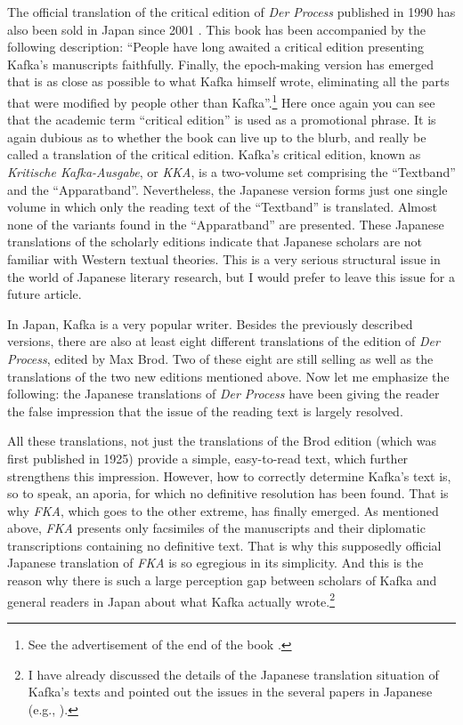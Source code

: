 \begin{paper}
The official translation of the critical edition of \emph{Der Process}
published in 1990 \citep{kafka_proces_1990-1,kafka_proces_1990} has also been sold in Japan
since 2001 \citep{kafka_shinpan_2001}. This book has been accompanied by the following
description: ``People have long awaited a critical edition presenting Kafka's
manuscripts faithfully. Finally, the epoch-making version has emerged
that is as close as possible to what Kafka himself wrote, eliminating
all the parts that were modified by people other than
Kafka''.\footnote{See the advertisement of the end of the book \citep{kafka_shinpan_2001}.} Here once again you can see that the academic term ``critical
edition'' is used as a promotional phrase. It is again dubious as to
whether the book can live up to the blurb, and really be called a
translation of the critical edition. Kafka's critical edition, known as
\emph{Kritische Kafka-Ausgabe}, or \emph{KKA}, is a two-volume set
comprising the ``Textband'' and the ``Apparatband''. Nevertheless, the
Japanese version forms just one single volume in which only the reading
text of the ``Textband'' is translated. Almost none of the variants
found in the ``Apparatband'' are presented. These Japanese translations
of the scholarly editions indicate that Japanese scholars are not
familiar with Western textual theories. This is a very serious
structural issue in the world of Japanese literary research, but I would
prefer to leave this issue for a future article.

In Japan, Kafka is a very popular writer. Besides the previously
described versions, there are also at least eight different translations
of the edition of \emph{Der Process}, edited by Max Brod. Two of these
eight \citep{kafka_shinpan_1953,kafka_shinpan_1966} are still selling as well as the translations
of the two new editions mentioned above. Now let me emphasize the
following: the Japanese translations of \emph{Der Process} have been
giving the reader the false impression that the issue of the reading
text is largely resolved.

All these translations, not just the translations of the Brod edition (which
was first published in 1925) provide a simple, easy-to-read text, which
further strengthens this impression. However, how to correctly determine
Kafka's text is, so to speak, an aporia, for which no definitive
resolution has been found. That is why \emph{FKA}, which goes to the
other extreme, has finally emerged. As mentioned above, \emph{FKA}
presents only facsimiles of the manuscripts and their diplomatic
transcriptions containing no definitive text. That is why this supposedly
official Japanese translation of \emph{FKA} is so egregious in its
simplicity. And this is the reason why there is such a large perception
gap between scholars of Kafka and general readers in Japan about what
Kafka actually wrote.\footnote{I have already discussed the details of
  the Japanese translation situation of Kafka's texts and pointed out
  the issues in the several papers in Japanese (e.g., \cite{myojo_kyokaisen_2012,myojo_honyakukano_2019}).}


\end{paper}
